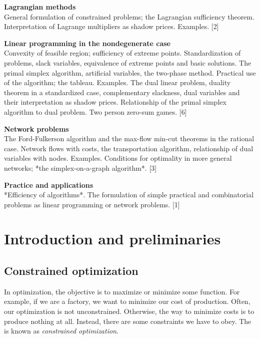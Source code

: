 \documentclass[a4paper]{article}
\begin{document}
\maketitle
{\small
\noindent\textbf{Lagrangian methods}\\
General formulation of constrained problems; the Lagrangian sufficiency theorem. Interpretation of Lagrange multipliers as shadow prices. Examples.\hspace*{\fill} [2]

\vspace{10pt}
\noindent\textbf{Linear programming in the nondegenerate case}\\
Convexity of feasible region; sufficiency of extreme points. Standardization of problems, slack variables, equivalence of extreme points and basic solutions. The primal simplex algorithm, artificial variables, the two-phase method. Practical use of the algorithm; the tableau. Examples. The dual linear problem, duality theorem in a standardized case, complementary slackness, dual variables and their interpretation as shadow prices. Relationship of the primal simplex algorithm to dual problem. Two person zero-sum games.\hspace*{\fill} [6]

\vspace{10pt}
\noindent\textbf{Network problems}\\
The Ford-Fulkerson algorithm and the max-flow min-cut theorems in the rational case. Network flows with costs, the transportation algorithm, relationship of dual variables with nodes. Examples. Conditions for optimality in more general networks; *the simplex-on-a-graph algorithm*.\hspace*{\fill} [3]

\vspace{10pt}
\noindent\textbf{Practice and applications}\\
*Efficiency of algorithms*. The formulation of simple practical and combinatorial problems as linear programming or network problems.\hspace*{\fill} [1]}

\tableofcontents

\section{Introduction and preliminaries}
\subsection{Constrained optimization}
In optimization, the objective is to maximize or minimize some function. For example, if we are a factory, we want to minimize our cost of production. Often, our optimization is not unconstrained. Otherwise, the way to minimize costs is to produce nothing at all. Instead, there are some constraints we have to obey. The is known as \emph{constrained optimization}.
\end{document}
